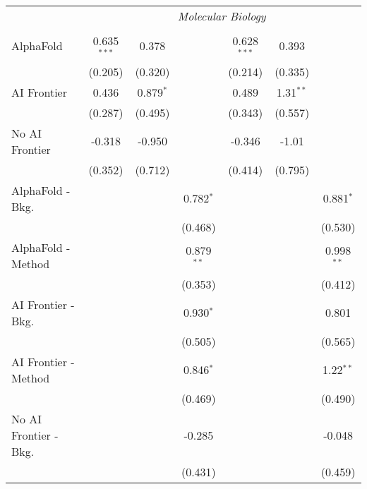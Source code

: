 \begin{tabular}{lcccccc}
 & \multicolumn{6}{c}{\textit{Molecular Biology}} \\ \\
   AlphaFold               & 0.635$^{***}$ & 0.378       &              & 0.628$^{***}$ & 0.393       &   \\   
                           & (0.205)       & (0.320)     &              & (0.214)       & (0.335)     &   \\   
   AI Frontier             & 0.436         & 0.879$^{*}$ &              & 0.489         & 1.31$^{**}$ &   \\   
                           & (0.287)       & (0.495)     &              & (0.343)       & (0.557)     &   \\   
   No AI Frontier          & -0.318        & -0.950      &              & -0.346        & -1.01       &   \\   
                           & (0.352)       & (0.712)     &              & (0.414)       & (0.795)     &   \\   
   AlphaFold - Bkg.        &               &             & 0.782$^{*}$  &               &             & 0.881$^{*}$\\   
                           &               &             & (0.468)      &               &             & (0.530)\\   
   AlphaFold - Method      &               &             & 0.879$^{**}$ &               &             & 0.998$^{**}$\\   
                           &               &             & (0.353)      &               &             & (0.412)\\   
   AI Frontier - Bkg.      &               &             & 0.930$^{*}$  &               &             & 0.801\\   
                           &               &             & (0.505)      &               &             & (0.565)\\   
   AI Frontier - Method    &               &             & 0.846$^{*}$  &               &             & 1.22$^{**}$\\   
                           &               &             & (0.469)      &               &             & (0.490)\\   
   No AI Frontier - Bkg.   &               &             & -0.285       &               &             & -0.048\\   
                           &               &             & (0.431)      &               &             & (0.459)\\   

\end{tabular}
